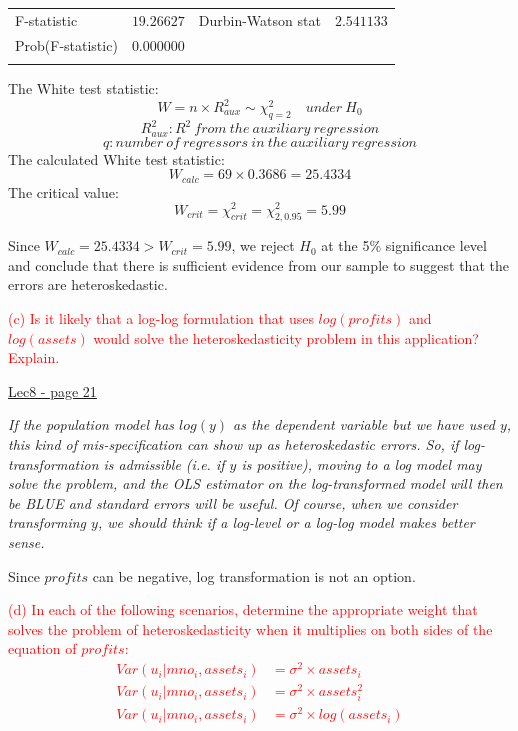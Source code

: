 \documentclass[12pt]{report}
\begin{document}
\begin{table}[H]
\begin{tabular}{lrrrr}
		\multicolumn{1}{l}{F-statistic}&\multicolumn{1}{r}{$19.26627$}&\multicolumn{2}{l}{Durbin-Watson stat}&\multicolumn{1}{r}{$2.541133$}\\
		\multicolumn{1}{l}{Prob(F-statistic)}&\multicolumn{1}{r}{$0.000000$}&\multicolumn{1}{c}{}&\multicolumn{1}{c}{}&\multicolumn{1}{c}{}\\
		[4.5pt] \hline \\ [-4.5pt]
	\end{tabular}
\end{table} \vspace{-\baselineskip} \noindent
The White test statistic:
$$W = n \times R^2_{aux} \sim \chi_{q=2}^2 \quad under\ H_0$$ $$R^2_{aux}: R^2\ from\ the\ auxiliary\ regression$$ $$q:number\ of\ regressors\ in\ the\ auxiliary\ regression$$ The calculated White test statistic: $$W_{calc} = 69 \times 0.3686 = 25.4334$$ The critical value: $$W_{crit} = \chi^2_{crit} = \chi_{2,0.95}^2 = 5.99$$

\noindent Since $W_{calc} = 25.4334 > W_{crit} = 5.99$, we reject $H_0$ at the 5\% significance level and conclude that there is sufficient evidence from our sample to suggest that the errors are heteroskedastic.



\newpage
\justify
\noindent \textcolor{red}
{
	(c) Is it likely that a log-log formulation that uses $log(profits)$ and $log(assets)$ would solve the heteroskedasticity problem in this application? Explain.
}

\noindent \uline{Lec8 - page 21}

\noindent \textit{If the population model has $log(y)$ as the dependent variable but we have used $y$, this kind of mis-specification can show up as heteroskedastic errors. So, if log-transformation is admissible (i.e. if $y$ is positive), moving to a log model may solve the problem, and the OLS estimator on the log-transformed model will then be BLUE and standard errors will be useful. Of course, when we consider transforming $y$, we should think if a log-level or a log-log model makes better sense.}

\noindent Since $profits$ can be negative, log transformation is not an option.


\newpage
\justify
\noindent \textcolor{red}
{
	(d) In each of the following scenarios, determine the appropriate weight that solves the problem of heteroskedasticity when it multiplies on both sides of the equation of $profits$: \begin{align*}
		Var(u_i|mno_i, assets_i) &= \sigma^2 \times assets_i \\
		Var(u_i|mno_i, assets_i) &= \sigma^2 \times assets_i^2 \\
		Var(u_i|mno_i, assets_i) &= \sigma^2 \times log(assets_i)
	\end{align*}
}
\end{document}
